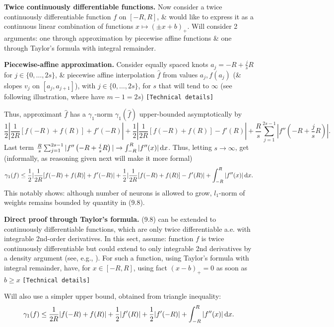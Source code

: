 \documentclass{article}
\begin{document}
\begin{enumerate}
\begin{itemize}
\begin{itemize}
\begin{itemize}
				{\bf Twice continuously differentiable functions.} Now consider a twice continuously differentiable function $f$ on $[-R,R]$, \& would like to express it as a continuous linear combination of functions $x\mapsto(\pm x + b)_+$. Will consider 2 arguments: one through approximation by piecewise affine functions \& one through Taylor's formula with integral remainder.
				
				{\bf Piecewise-affine approximation.} Consider equally spaced knots $a_j = -R + \frac{j}{s}R$ for $j\in\{0,\ldots,2s\}$, \& piecewise affine interpolation $\hat{f}$ from values $a_j,f(a_j)$ (\& slopes $v_j$ on $[a_j,a_{j+1}]$), with $j\in\{0,\ldots,2s\}$, for $s$ that will tend to $\infty$ (see following illustration, where have $m - 1 = 2s$) {\tt[Technical details]}
				
				Thus, approximant $\hat{f}$ has a $\gamma_1$-norm $\gamma_1(\hat{f})$ upper-bounded asymptotically by
				\begin{equation}
					\frac{1}{2}|\frac{1}{2R}[f(-R) + f(R)] + f'(-R)| + \frac{1}{2}|\frac{1}{2R}[f(-R) + f(R)] - f'(R)| + \frac{R}{s}\sum_{j=1}^{2s - 1} |f''\left(-R + \frac{j}{s}R\right)|.
				\end{equation}
				Last term $\frac{R}{s}\sum_{j=1}^{2s - 1}|f''\left(-R + \frac{j}{s}R\right)|\to\int_{-R}^R |f''(x)|\,{\rm d}x$. Thus, letting $s\to\infty$, get (informally, as reasoning given next will make it more formal)
				\begin{equation}
					\gamma_1(f)\le\frac{1}{2}|\frac{1}{2R}[f(-R) + f(R)] + f'(-R)| + \frac{1}{2}|\frac{1}{2R}[f(-R) + f(R)] - f'(R)| + \int_{-R}^R |f''(x)|\,{\rm d}x.
				\end{equation}
				This notably shows: although number of neurons is allowed to grow, $l_1$-norm of weights remains bounded by quantity in (9.8).
				
				{\bf Direct proof through Taylor's formula.} (9.8) can be extended to continuously differentiable functions, which are only twice differentiable a.e. with integrable 2nd-order derivatives. In this sect, assume: function $f$ is twice continuously differentiable but could extend to only integrable 2nd derivatives by a density argument (see, e.g., \cite{Rudin1987}). For such a function, using Taylor's formula with integral remainder, have, for $x\in[-R,R]$, using fact $(x - b)_+ = 0$ as soon as $b\ge x$ {\tt[Technical details]}
				
				Will also use a simpler upper bound, obtained from triangle inequality:
				\begin{equation}
					\gamma_1(f)\le\frac{1}{2R}|f(-R) + f(R)| + \frac{1}{2}|f'(R)| + \frac{1}{2}|f'(-R)| + \int_{-R}^R |f''(x)|\,{\rm d}x.
				\end{equation}
				

\end{itemize}
\end{itemize}
\end{itemize}
\end{enumerate}
\end{document}
